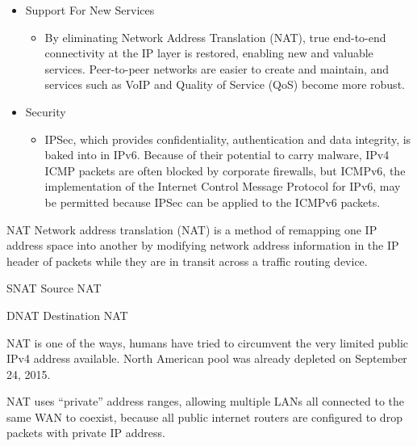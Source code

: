 \documentclass[fancy,11pt,titlestyle=display]{style/elegantbook}
\begin{document}
\begin{itemize}
       
    \item Support For New Services



    \begin{itemize}
        \item By eliminating Network Address Translation (NAT), true end-to-end connectivity at the IP layer is restored, enabling new and valuable services. Peer-to-peer networks are easier to create and maintain, and services such as VoIP and Quality of Service (QoS) become more robust.
    \end{itemize}

  \item Security




    \begin{itemize}
        \item IPSec, which provides confidentiality, authentication and data integrity, is baked into in IPv6. Because of their potential to carry malware, IPv4 ICMP packets are often blocked by corporate firewalls, but ICMPv6, the implementation of the Internet Control Message Protocol for IPv6, may be permitted because IPSec can be applied to the ICMPv6 packets.
    \end{itemize}


\end{itemize}



\begin{definition}{NAT}{}
Network address translation (NAT) is a method of remapping one IP address space into another by modifying network address information in the IP header of packets while they are in transit across a traffic routing device.
\end{definition}
\begin{definition}{SNAT}{}
Source NAT
\end{definition}

\begin{definition}{DNAT}{}
Destination NAT
\end{definition}
NAT is one of the ways, humans have tried to circumvent the very limited public IPv4 address available. 
North American pool was already depleted on September 24, 2015. 

NAT uses ``private'' address ranges, allowing multiple LANs all connected to the same WAN to coexist, because all public internet routers are configured to drop packets with private IP address.
\end{document}
